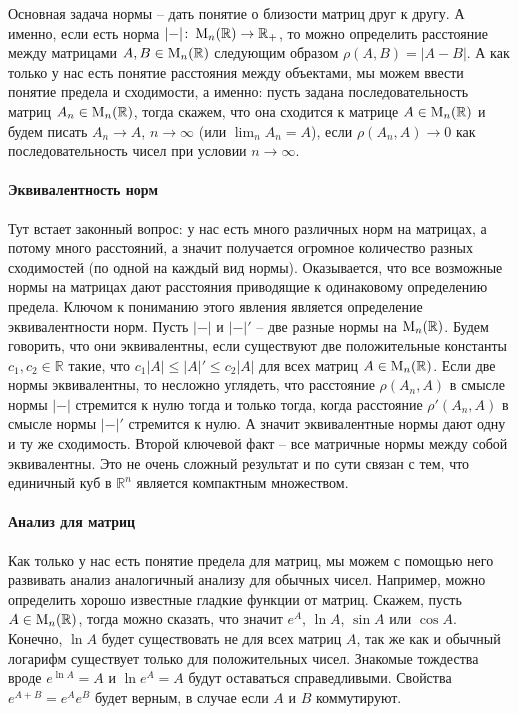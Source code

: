 Основная задача нормы -- дать понятие о близости матриц друг к другу. А именно, если есть норма $|{-}|\colon \operatorname{M}_{n}(\mathbb R)\to \mathbb R_+$, то можно определить расстояние между матрицами $A, B\in\operatorname{M}_{n}(\mathbb R)$ следующим образом $\rho(A, B) = |A - B|$. А как только у нас есть понятие расстояния между объектами, мы можем ввести понятие предела и сходимости, а именно: пусть задана последовательность матриц $A_n\in\operatorname{M}_{n}(\mathbb R)$, тогда скажем, что она сходится к матрице $A\in\operatorname{M}_{n}(\mathbb R)$ и будем писать $A_n\to A$, $n\to \infty$ (или $\lim_n A_n = A$), если $\rho(A_n, A)\to 0$ как последовательность чисел при условии $n\to \infty$.

\paragraph{Эквивалентность норм}

Тут встает законный вопрос: у нас есть много различных норм на матрицах, а потому много расстояний, а значит получается огромное количество разных сходимостей (по одной на каждый вид нормы). Оказывается, что все возможные нормы на матрицах дают расстояния приводящие к одинаковому определению предела. Ключом к пониманию этого явления является определение эквивалентности норм. Пусть $|{-}|$ и $|{-}|'$ -- две разные нормы на $\operatorname{M}_{n}(\mathbb R)$. Будем говорить, что они эквивалентны, если существуют две положительные константы $c_1, c_2\in\mathbb R$ такие, что $c_1 |A|\leqslant |A|'\leqslant c_2|A|$ для всех матриц $A\in \operatorname{M}_{n}(\mathbb R)$. Если две нормы эквивалентны, то несложно углядеть, что расстояние $\rho(A_n,A)$ в смысле нормы $|{-}|$ стремится к нулю  тогда и только тогда, когда расстояние $\rho'(A_n,A)$ в смысле нормы $|{-}|'$ стремится к нулю. А значит эквивалентные нормы дают одну и ту же сходимость. Второй ключевой факт -- все матричные нормы между собой эквивалентны. Это не очень сложный результат и по сути связан с тем, что единичный куб в $\mathbb R^n$ является компактным множеством.

\paragraph{Анализ для матриц}

Как только у нас есть понятие предела для матриц, мы можем с помощью него развивать анализ аналогичный анализу для обычных чисел. Например, можно определить хорошо известные гладкие функции от матриц. Скажем, пусть $A\in\operatorname{M}_{n}(\mathbb R)$, тогда можно сказать, что значит $e^A$, $\ln A$, $\sin A$ или $\cos A$. Конечно, $\ln A$ будет существовать не для всех матриц $A$, так же как и обычный логарифм существует только для положительных чисел. Знакомые тождества вроде $e^{\ln A} = A$ и $\ln e^A = A$ будут оставаться справедливыми. Свойства $e^{A+B}= e^A e^B$ будет верным, в случае если $A$ и $B$ коммутируют.


